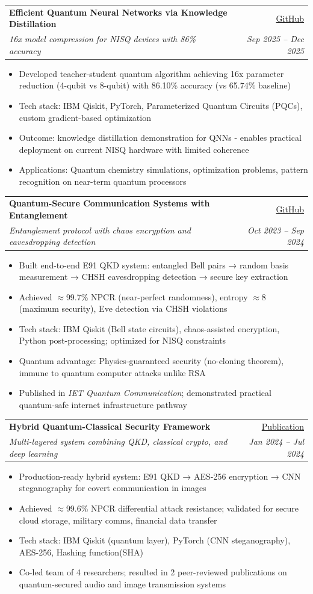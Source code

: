 \documentclass[10pt,letter]{article}
\makeatletter
\newcommand{\resumeItem}[1]{
  \item\small{
    {#1 \vspace{-2pt}}
  }
}
\newcommand{\resumeSubheading}[4]{
  \vspace{-2pt}\item
    \begin{tabular*}{\textwidth}[t]{l@{\extracolsep{\fill}}r}
      \textbf{#1} & #2 \\
      \textit{\small#3} & \textit{\small #4} \\
    \end{tabular*}\vspace{-7pt}
}
\newcommand{\resumeItemListStart}{\begin{itemize}}
\newcommand{\resumeItemListEnd}{\end{itemize}\vspace{-5pt}}
\makeatother
\begin{document}
      \resumeSubheading
        {Efficient Quantum Neural Networks via Knowledge Distillation}{\href{https://github.com/shawmoonazad/Parameter-Efficient-Quantum-Neural-Networks-via-Knowledge-Distillation.git}{GitHub}}
        {16x model compression for NISQ devices with 86\% accuracy}{Sep 2025 -- Dec 2025}
        \resumeItemListStart
          \resumeItem{Developed teacher-student quantum algorithm achieving 16x parameter reduction (4-qubit vs 8-qubit) with 86.10\% accuracy (vs 65.74\% baseline)}
          \resumeItem{Tech stack: IBM Qiskit, PyTorch, Parameterized Quantum Circuits (PQCs), custom gradient-based optimization}
          \resumeItem{Outcome: knowledge distillation demonstration for QNNs - enables practical deployment on current NISQ hardware with limited coherence}
          \resumeItem{Applications: Quantum chemistry simulations, optimization problems, pattern recognition on near-term quantum processors}
        \resumeItemListEnd

      \resumeSubheading
        {Quantum-Secure Communication Systems with Entanglement}{\href{https://github.com/shawmoonazad/Chaos-Assisted-Quantum-Key-Distribution-Approach-Using-Entanglement.git}{GitHub}}
        {Entanglement protocol with chaos encryption and eavesdropping detection}{Oct 2023 -- Sep 2024}
        \resumeItemListStart
          \resumeItem{Built end-to-end E91 QKD system: entangled Bell pairs → random basis measurement → CHSH eavesdropping detection → secure key extraction}
          \resumeItem{Achieved $\approx$99.7\% NPCR (near-perfect randomness), entropy $\approx$8 (maximum security), Eve detection via CHSH violations}
          \resumeItem{Tech stack: IBM Qiskit (Bell state circuits), chaos-assisted encryption, Python post-processing; optimized for NISQ constraints}
          \resumeItem{Quantum advantage: Physics-guaranteed security (no-cloning theorem), immune to quantum computer attacks unlike RSA}
          \resumeItem{Published in \textit{IET Quantum Communication}; demonstrated practical quantum-safe internet infrastructure pathway}
        \resumeItemListEnd

      \resumeSubheading
        {Hybrid Quantum-Classical Security Framework}{\href{https://doi.org/10.1016/j.aej.2025.02.056}{Publication}}
        {Multi-layered system combining QKD, classical crypto, and deep learning}{Jan 2024 -- Jul 2024}
        \resumeItemListStart
          \resumeItem{Production-ready hybrid system: E91 QKD → AES-256 encryption → CNN steganography for covert communication in images}
          \resumeItem{Achieved $\approx$99.6\% NPCR differential attack resistance; validated for secure cloud storage, military comms, financial data transfer}
          \resumeItem{Tech stack: IBM Qiskit (quantum layer), PyTorch (CNN steganography), AES-256, Hashing function(SHA)}
          \resumeItem{Co-led team of 4 researchers; resulted in 2 peer-reviewed publications on quantum-secured audio and image transmission systems}
        \resumeItemListEnd
\end{document}
